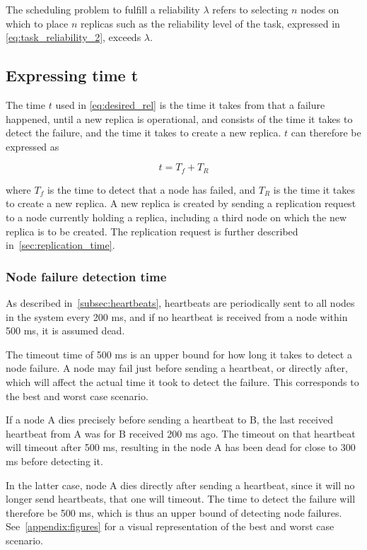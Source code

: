 \documentclass{cslthse-msc}
\begin{document}
The scheduling problem to fulfill a reliability $\lambda$ refers to selecting $n$ nodes on which to place $n$ replicas such as the reliability level of the task, expressed in \cref{eq:task_reliability_2}, exceeds $\lambda$.

\subsection{Expressing time t} \label{sec:design_time_t}
The time $t$ used in \cref{eq:desired_rel} is the time it takes from that a failure happened, until a new replica is operational, and consists of the time it takes to detect the failure, and the time it takes to create a new replica. $t$ can therefore be expressed as 

\begin{equation} \label{eq:rep_time}
	t = T_f + T_R
\end{equation}

where $T_f$ is the time to detect that a node has failed, and $T_R$ is the time it takes to create a new replica. A new replica is created by sending a replication request to a node currently holding a replica, including a third node on which the new replica is to be created. The replication request is further described in~\cref{sec:replication_time}.

\subsubsection{Node failure detection time} \label{sec:node_failure_detection_time}
As described in~\cref{subsec:heartbeats}, heartbeats are periodically sent to all nodes in the system every 200 ms, and if no heartbeat is received from a node within 500 ms, it is assumed dead.

The timeout time of 500 ms is an upper bound for how long it takes to detect a node failure. A node may fail just before sending a heartbeat, or directly after, which will affect the actual time it took to detect the failure. This corresponds to the best and worst case scenario. 

If a node A dies precisely before sending a heartbeat to B, the last received heartbeat from A was for B received 200 ms ago. The timeout on that heartbeat will timeout after 500 ms, resulting in the node A has been dead for close to 300 ms before detecting it.

In the latter case, node A dies directly after sending a heartbeat, since it will no longer send heartbeats, that one will timeout. The time to detect the failure will therefore be 500 ms, which is thus an upper bound of detecting node failures. See~\cref{appendix:figures} for a visual representation of the best and worst case scenario.
\end{document}
